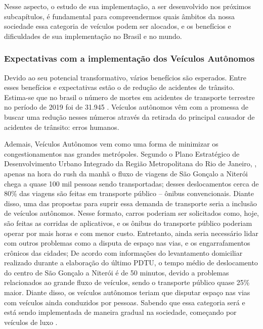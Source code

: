 Nesse aspecto, o estudo de sua implementação, a ser desenvolvido nos próximos subcapítulos, é fundamental para compreendermos quais âmbitos da nossa sociedade essa categoria de veículos podem ser alocados, e os benefícios e dificuldades de sua implementação no Brasil e no mundo.

 \subsubsection{Expectativas com a implementação dos Veículos Autônomos}
Devido ao seu potencial transformativo, vários benefícios são esperados. Entre esses benefícios e expectativas estão o de redução de acidentes de trânsito. Estima-se que no brasil o número de mortes em acidentes de transporte terrestre no período de 2019 foi de 31.945 \cite{Anexo_I_pnatrans}. Veículos autônomos vêm com a promessa de buscar uma redução nesses números através da retirada do principal causador de acidentes de trânsito: erros humanos. 

Ademais, Veículos Autônomos vem como uma forma de minimizar os congestionamentos nas grandes metrópoles. Segundo o  Plano Estratégico de Desenvolvimento Urbano Integrado da Região Metropolitana do Rio de Janeiro, \cite{rj_transito}, apenas na hora do rush da manhã o fluxo de viagens de São Gonçalo a Niterói chega a quase 100 mil pessoas sendo transportadas; desses deslocamentos cerca de 80\% das viagens são feitas em transporte público – ônibus convencionais. Diante disso, uma das propostas para suprir essa demanda de transporte seria a inclusão de veículos autônomos. Nesse formato, carros poderiam ser solicitados como, hoje, são feitas as corridas de aplicativos, e os ônibus do transporte público  poderiam operar por mais horas e com menor custo. 
Entretanto, ainda seria necessário lidar com outros problemas como a disputa de espaço nas vias, e os engarrafamentos crônicos das cidades; De acordo com informações do levantamento domiciliar realizado durante a elaboração do último PDTU, o tempo médio de deslocamento do centro de São Gonçalo a Niterói é de 50 minutos, devido a problemas relacionados ao grande fluxo de veículos, sendo o transporte público quase 25\% maior. Diante disso, os veículos autônomos teriam que disputar espaço nas vias com veículos ainda conduzidos por pessoas. Sabendo que essa categoria será e está sendo implementada de maneira gradual na sociedade, começando por veículos de luxo \cite{caio}.

